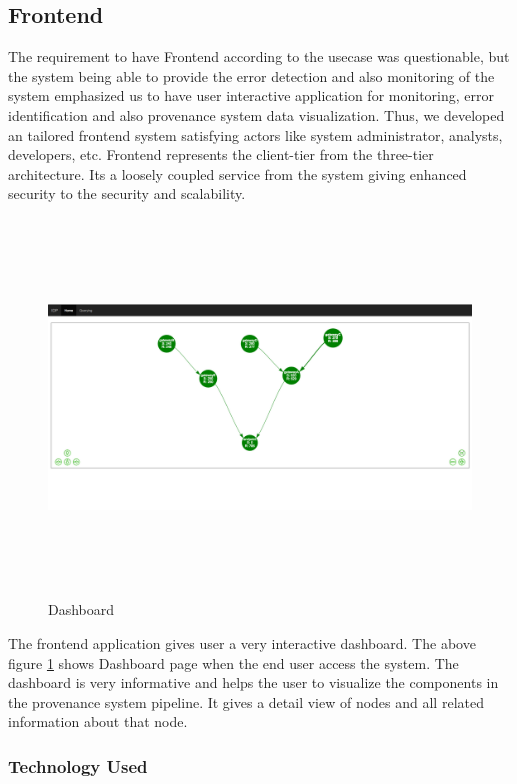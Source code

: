 
\subsection{Frontend}
The requirement to have Frontend according to the usecase was questionable, but the system being able to provide the error detection and also monitoring of the system emphasized us to have user interactive application for monitoring, error identification and also provenance system data visualization. Thus, we developed an tailored frontend system satisfying actors like system administrator, analysts, developers, etc. Frontend represents the client-tier from the three-tier architecture. Its a loosely coupled service from the system giving enhanced security to the security and scalability.

\begin{figure}
    \centering
    \includegraphics[width=\textwidth,height=10cm,keepaspectratio]{figures/dashboard.png}
    \caption{\label{fig:dashboard}Dashboard}
\end{figure}

The frontend application gives user a very interactive dashboard. The above figure \ref{fig:dashboard} shows Dashboard page when the end user access the system. The dashboard is very informative and helps the user to visualize the components in the provenance system pipeline. It gives a detail view of nodes and all related information about that node.

\subsubsection{Technology Used}

